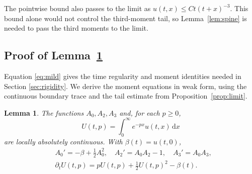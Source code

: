 \documentclass[11pt,letterpaper,reqno]{amsart}
\numberwithin{equation}{section}
\theoremstyle{plain}
\newtheorem{lemma}[theorem]{Lemma}
\theoremstyle{remark}
\newcommand{\dd}{\,\mathrm d}
\begin{document}
The pointwise bound also passes to the limit as $u(t,x)\le Ct(t+x)^{-3}$. This bound alone would not control the third-moment tail, so Lemma~\ref{lem:spine} is needed to pass the third moments to the limit.

\subsection{Proof of Lemma~\ref{lem:momentODE}} \label{subsec:prop:momentODE_proof}
Equation \eqref{eq:mild} gives the time regularity and moment identities needed in Section \ref{sec:rigidity}. We derive the moment equations in weak form, using the continuous boundary trace and the tail estimate from Proposition~\ref{prop:limit}.

\begin{lemma}\label{lem:momentODE}
The functions $A_0,A_2,A_3$ and, for each $p\ge0$,
\[
 U(t,p)=\int_0^\infty e^{-px}u(t,x)\dd x
\]
are locally absolutely continuous. With $\beta(t)=u(t,0)$,
\begin{align}
 & A_0'=-\beta+\tfrac12 A_0^2, \quad
 A_2'=A_0A_2-1, \quad A_3'=A_0A_3,\label{eq:momentODE}\\
 & \partial_tU(t,p)=pU(t,p)+\tfrac12U(t,p)^2-\beta(t).\label{eq:laplaceODE}
\end{align}
\end{lemma}
\end{document}
